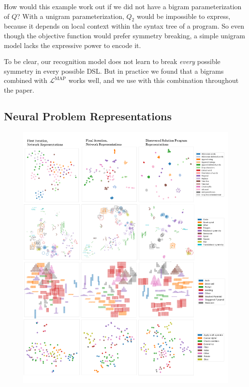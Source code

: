 \documentclass{article}
\begin{document}
How would this example work out if we did not have a bigram
parameterization of $Q$?  With a unigram parameterization, $Q_2$ would
be impossible to express, because it depends on local context within
the syntax tree of a program. So even though the objective function would prefer symmetry breaking,
a simple unigram model lacks the expressive power to
encode it.

To be clear,
our recognition model does not learn to break \emph{every} possible symmetry in every possible DSL.
But in practice we found that a bigrams combined with $\mathcal{L}^{\text{MAP}}$
works well,
and we use with this combination throughout the paper.

\subsection{Neural Problem Representations}

\begin{figure}
  \includegraphics[width = \textwidth]{figures/all_tsne.png}
  \caption{}\label{allTSNE}
\end{figure}
\end{document}
